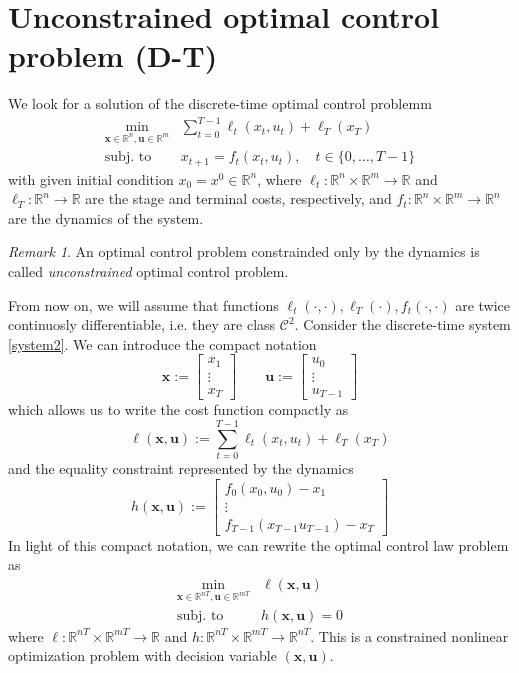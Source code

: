 \documentclass[openany]{book}
\newcommand{\R}{\mathbb{R}}                %
\theoremstyle{definition}
\theoremstyle{remark}
\newtheorem*{remark}{Remark}
\begin{document}
\section{Unconstrained optimal control problem (D-T)}
We look for a solution of the discrete-time optimal control problemm 
\begin{align*}
        \min_{\mathbf{x}\in\R^n,\mathbf{u}\in\R^m} & \displaystyle\sum_{t=0}^{T-1}\ell_t(x_t,u_t)+\ell_T(x_T)\\
        \text{subj. to } & x_{t+1} = f_t(x_t,u_t), \quad t\in\{0,\dots,T-1\} 
\end{align*}
with given initial condition $x_0 = x^0\in \R^n$, where $\ell_t:\R^n\times\R^m\to\R$ and $\ell_T:\R^n\to\R$ are the stage and terminal costs, respectively, and $f_t:\R^n\times\R^m\to\R^n$ are the dynamics of the system.
\begin{remark}
    An optimal control problem constrainded only by the dynamics is called \emph{unconstrained} optimal control problem.
\end{remark}

From now on, we will assume that functions $\ell_t(\cdot,\cdot),\ell_T(\cdot),f_t(\cdot,\cdot)$ are twice continuosly differentiable, i.e. they are class $\mathcal{C}^2$.
Consider the discrete-time system \eqref{system2}. We can introduce the compact notation 
\[
    \mathbf{x} := \begin{bmatrix}
        x_1 \\ \vdots \\ x_T
    \end{bmatrix} \qquad \mathbf{u} := \begin{bmatrix}
        u_0 \\ \vdots \\ u_{T-1}
    \end{bmatrix}
\]
which allows us to write the cost function compactly as 
\[
    \ell({\mathbf{x},\mathbf{u}}) := \sum_{t=0}^{T-1}\ell_t(x_t,u_t)+\ell_T(x_T)
\]
and the equality constraint represented by the dynamics 
\[
    h(\mathbf{x},\mathbf{u}) := \begin{bmatrix}
        f_0(x_0,u_0)-x_1 \\ \vdots \\ f_{T-1}(x_{T-1}u_{T-1})-x_T
    \end{bmatrix}
\]
In light of this compact notation, we can rewrite the optimal control law problem as 
\begin{align*}
    \min_{\mathbf{x}\in\R^{nT},\mathbf{u}\in\R^{mT}} &\ell(\mathbf{x},\mathbf{u})\\
    \text{subj. to } & h(\mathbf{x},\mathbf{u})=0
\end{align*}
where $\ell:\R^{nT}\times\R^{mT}\to\R$ and $h:\R^{nT}\times\R^{mT}\to\R^{nT}$. This is a constrained nonlinear optimization problem with decision variable $(\mathbf{x},\mathbf{u})$.
\end{document}
